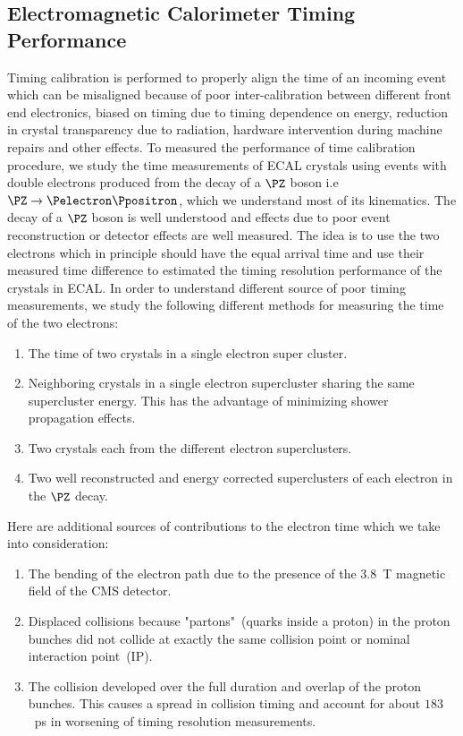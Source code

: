 \subsection{Electromagnetic Calorimeter Timing Performance}
Timing calibration is performed to properly align the time of an incoming event which can be misaligned because of poor inter-calibration between different front end electronics, biased on timing due to timing dependence on energy, reduction in \pb crystal transparency due to radiation, hardware intervention during machine repairs and other effects. To measured the performance of time calibration procedure, we study the time measurements of ECAL crystals using events with double electrons produced from the decay of a $\PZ$ boson  i.e $\PZ \rightarrow \Pelectron \Ppositron$, which we understand most of its kinematics.  The decay of a $\PZ$ boson is well understood and effects due to poor event reconstruction or detector effects are well measured. 
The idea is to use the two electrons which in principle should have the equal arrival time  and use their measured time difference to estimated the timing resolution performance of the \pb crystals in ECAL. In order to understand different source of poor timing measurements, we study the following different methods for measuring the time of the two electrons:
\begin{enumerate}
\item The time of two crystals in a single electron super cluster.
\item Neighboring crystals in a single electron supercluster sharing the same supercluster energy. This has the advantage of minimizing shower propagation effects.
\item Two crystals each from the different electron superclusters.
\item Two well reconstructed and energy corrected superclusters of each electron in the $\PZ$ decay. 
\end{enumerate}

Here are additional sources of contributions to the electron time which we take into consideration:
\begin{enumerate}
\item The bending of the electron path due to the presence of the $3.8$~T magnetic field of the CMS detector.
\item  Displaced collisions because "partons"~(quarks inside a proton) in the proton bunches did not collide at exactly the same collision point or nominal interaction point~(IP).
\item The collision developed over the full duration and overlap of the proton bunches. This causes a spread in collision timing and account for about $183$~ps in worsening of timing resolution measurements.
\end{enumerate}

